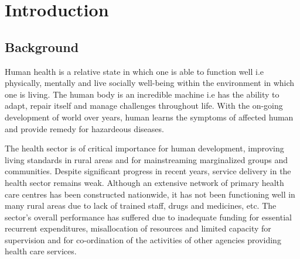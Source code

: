 {
\KECadjusttocspacings %
\makeatletter
\def\@makeschapterhead#1{%
  {\newpage \parindent \z@ \raggedright
    \normalfont
    \interlinepenalty\@M
    \center \fontsize{16pt}{1} \bfseries \MakeUppercase{#1}\par\nobreak
    \vskip 18\p@ %
  }}
\makeatother 

\tableofcontents %
\listoffigures %

}



\newpage
{} %

\chapter{Introduction}
\section{Background}\label{sec:bkgrnd}%
Human health is a relative state in which one is able to function well i.e physically, mentally and live socially well-being within the environment in which one is living. The human body is an incredible machine i.e has the ability to adapt, repair itself and manage challenges throughout life. With the on-going development of world over years, human learns the symptoms of affected human and provide remedy for hazardeous diseases.\par
The health sector is of critical importance for human development, improving living standards in rural areas and for mainstreaming marginalized groups and communities. Despite significant progress in recent years, service delivery in the health sector remains weak.  Although an extensive network of primary health care centres has been constructed nationwide, it has not been functioning well in many rural areas due to lack of trained staff, drugs and medicines, etc.  The sector's overall performance has suffered due to inadequate funding for essential recurrent  expenditures, misallocation  of  resources  and  limited  capacity  for supervision and for co-ordination of the activities of other agencies providing health care services.\par


